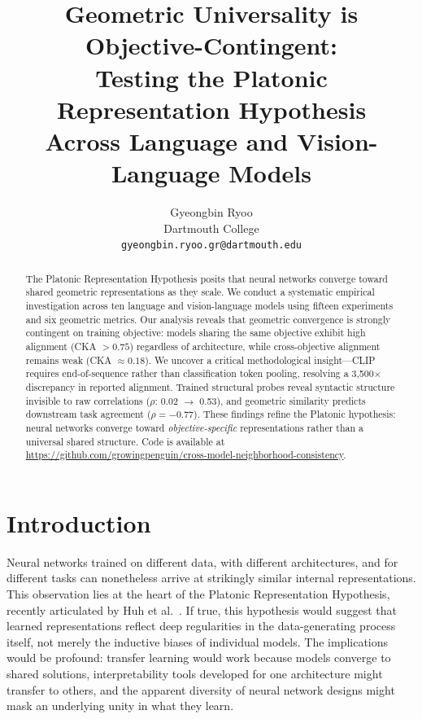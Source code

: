 \documentclass{article}
\title{Geometric Universality is Objective-Contingent: \\
Testing the Platonic Representation Hypothesis \\
Across Language and Vision-Language Models}
\author{
  Gyeongbin Ryoo\\
  Dartmouth College\\
  \texttt{gyeongbin.ryoo.gr@dartmouth.edu}
}
\begin{document}
\maketitle

\begin{abstract}
The Platonic Representation Hypothesis posits that neural networks converge toward shared geometric representations as they scale. We conduct a systematic empirical investigation across ten language and vision-language models using fifteen experiments and six geometric metrics. Our analysis reveals that geometric convergence is strongly contingent on training objective: models sharing the same objective exhibit high alignment (CKA $> 0.75$) regardless of architecture, while cross-objective alignment remains weak (CKA $\approx 0.18$). We uncover a critical methodological insight---CLIP requires end-of-sequence rather than classification token pooling, resolving a 3,500$\times$ discrepancy in reported alignment. Trained structural probes reveal syntactic structure invisible to raw correlations ($\rho$: 0.02 $\rightarrow$ 0.53), and geometric similarity predicts downstream task agreement ($\rho = -0.77$). These findings refine the Platonic hypothesis: neural networks converge toward \emph{objective-specific} representations rather than a universal shared structure. Code is available at \url{https://github.com/growingpenguin/cross-model-neighborhood-consistency}.
\end{abstract}

\section{Introduction}

Neural networks trained on different data, with different architectures, and for different tasks can nonetheless arrive at strikingly similar internal representations. This observation lies at the heart of the Platonic Representation Hypothesis, recently articulated by Huh et al.~\cite{huh2024platonic}. If true, this hypothesis would suggest that learned representations reflect deep regularities in the data-generating process itself, not merely the inductive biases of individual models. The implications would be profound: transfer learning would work because models converge to shared solutions, interpretability tools developed for one architecture might transfer to others, and the apparent diversity of neural network designs might mask an underlying unity in what they learn.
\end{document}
